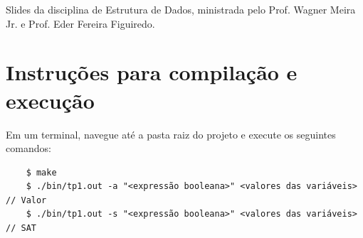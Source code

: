 \documentclass{article}
\begin{document}
Slides da disciplina de Estrutura de Dados, ministrada pelo Prof. Wagner Meira Jr. e Prof. Eder Fereira Figuiredo.


\section*{Instruções para compilação e execução}

Em um terminal, navegue até a pasta raiz do projeto e execute os seguintes comandos:

\begin{verbatim}
    $ make
    $ ./bin/tp1.out -a "<expressão booleana>" <valores das variáveis> // Valor 
    $ ./bin/tp1.out -s "<expressão booleana>" <valores das variáveis> // SAT
\end{verbatim}
\end{document}

